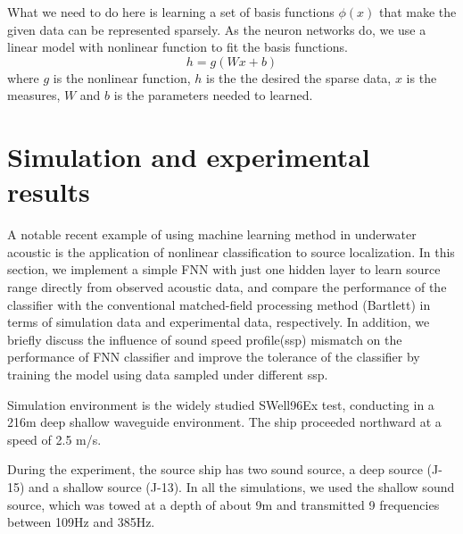 What we need to do here is learning a set of basis functions $\phi(x)$ that make the given data can be represented sparsely.
As the neuron networks do, we use a linear model with nonlinear function to fit the basis functions.
\begin{equation}
h = g(Wx + b)
\end{equation}
where $g$ is the nonlinear function, $h$ is the the desired the sparse data, $x$ is the measures, $W$ and
$b$ is the parameters needed to learned.

\section{Simulation and experimental results}
A notable recent example of using machine learning method in underwater acoustic is the application of nonlinear classification to source localization\cite{niu2017source}.
In this section, we implement a simple FNN with just one hidden layer to learn source range directly from observed acoustic data,
and compare the performance of the classifier with the conventional matched-field processing method (Bartlett) in terms of simulation data and experimental data, respectively. In addition, we briefly discuss the influence of sound speed profile(ssp) mismatch on the performance of FNN classifier and improve the tolerance of the classifier by training the model using data sampled under different ssp.

Simulation environment is the widely studied SWell96Ex test, conducting in a 216m deep shallow waveguide environment. The ship proceeded northward at a speed of 2.5 m/s.

During the experiment, the source ship has two sound source, a deep source (J-15) and a shallow source (J-13). In all the simulations, we used the shallow sound source, which was towed at a depth of about 9m and transmitted 9 frequencies between 109Hz and 385Hz.

